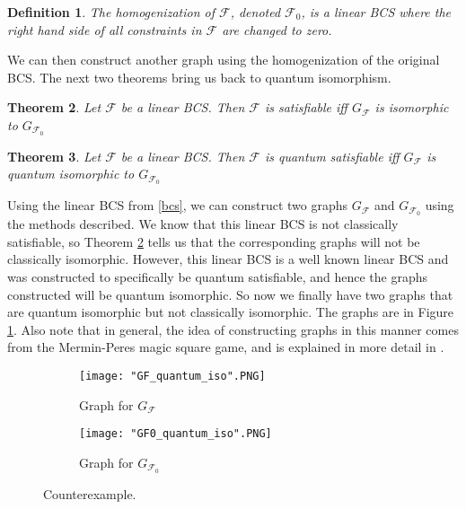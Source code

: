 \documentclass[12pt]{article}
\newtheorem{thm}{Theorem}[section]
\newtheorem{defn}[thm]{Definition}
\begin{document}
\begin{defn}
The homogenization of $\mathcal{F}$, denoted $\mathcal{F}_0$, is a linear BCS where the right hand side of all constraints in $\mathcal{F}$ are changed to zero.
\end{defn}
We can then construct another graph using the homogenization of the original BCS. The next two theorems bring us back to quantum isomorphism.


\begin{thm}
\label{classicalBCS}
Let $\mathcal{F}$ be a linear BCS. Then $\mathcal{F}$ is satisfiable iff $G_{\mathcal{F}}$ is isomorphic to $G_{\mathcal{F}_0}$
\end{thm}

\begin{thm}
\label{quantumBCS}
Let $\mathcal{F}$ be a linear BCS. Then $\mathcal{F}$ is quantum satisfiable iff $G_{\mathcal{F}}$ is quantum isomorphic to $G_{\mathcal{F}_0}$
\end{thm}

Using the linear BCS from \ref{bcs}, we can construct two graphs $G_{\mathcal{F}}$ and $G_{\mathcal{F}_0}$ using the methods described. We know that this linear BCS is not classically satisfiable, so Theorem \ref{classicalBCS} tells us that the corresponding graphs will not be classically isomorphic. However, this linear BCS is a well known linear BCS and was constructed to specifically be quantum satisfiable, and hence the graphs constructed will be quantum isomorphic. So now we finally have two graphs that are quantum isomorphic but not classically isomorphic. The graphs are in Figure \ref{fig:qisoNOTiso}. Also note that in general, the idea of constructing graphs in this manner comes from the Mermin-Peres magic square game, and is explained in more detail in \cite{QuantumMagic}.

\begin{figure}
\centering
  \begin{subfigure}[b]{0.4\textwidth}
    \texttt{[image: "GF\_quantum\_iso".PNG]}
    \caption{Graph for $G_{\mathcal{F}}$}
  \end{subfigure}
  \begin{subfigure}[b]{0.4\textwidth}
    \texttt{[image: "GF0\_quantum\_iso".PNG]}
    \caption{Graph for $G_{\mathcal{F}_0}$}
  \end{subfigure}
\caption{Counterexample.}
\label{fig:qisoNOTiso}
\end{figure}
\end{document}
